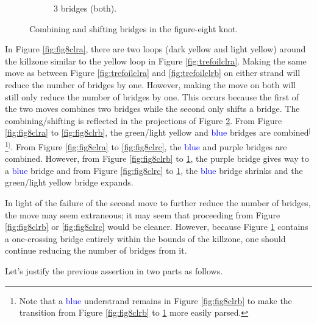 \documentclass[titlepage]{article}
\begin{document}
\begin{figure}[h!]
\begin{subfigure}[b]{0.4\linewidth}
        \caption{3 bridges (both).}
        \label{fig:fig8clrd}
    \end{subfigure}
    \caption{Combining and shifting bridges in the figure-eight knot.}
    \label{fig:fig8clr}
\end{figure}

In Figure \ref{fig:fig8clra}, there are two loops (\textcolor{yly}{dark yellow} and \textcolor{ylz}{light yellow}) around the killzone similar to the \textcolor{ylx}{yellow} loop in Figure \ref{fig:trefoilclra}. Making the same move as between Figure \ref{fig:trefoilclra} and \ref{fig:trefoilclrb} on either strand will reduce the number of bridges by one. However, making the move on both will still only reduce the number of bridges by one. This occurs because the first of the two moves combines two bridges while the second only shifts a bridge. The combining/shifting is reflected in the projections of Figure \ref{fig:fig8clr}. From Figure \ref{fig:fig8clra} to \ref{fig:fig8clrb}, the \textcolor{grx}{green}/\textcolor{ylz}{light yellow} and \textcolor{blue}{blue} bridges are combined$^[$\footnote{Note that a \textcolor{blue}{blue} understrand remains in Figure \ref{fig:fig8clrb} to make the transition from Figure \ref{fig:fig8clrb} to \ref{fig:fig8clrd} more easily parsed.}$^]$. From Figure \ref{fig:fig8clra} to \ref{fig:fig8clrc}, the \textcolor{blue}{blue} and \textcolor{pux}{purple} bridges are combined. However, from Figure \ref{fig:fig8clrb} to \ref{fig:fig8clrd}, the \textcolor{pux}{purple} bridge gives way to a \textcolor{blue}{blue} bridge and from Figure \ref{fig:fig8clrc} to \ref{fig:fig8clrd}, the \textcolor{blue}{blue} bridge shrinks and the \textcolor{grx}{green}/\textcolor{ylz}{light yellow} bridge expands.\par
In light of the failure of the second move to further reduce the number of bridges, the move may seem extraneous; it may seem that proceeding from Figure \ref{fig:fig8clrb} or \ref{fig:fig8clrc} would be cleaner. However, because Figure \ref{fig:fig8clrd} contains a one-crossing bridge entirely within the bounds of the killzone, one should continue reducing the number of bridges from it.\par
Let's justify the previous assertion in two parts as follows.
\end{document}
